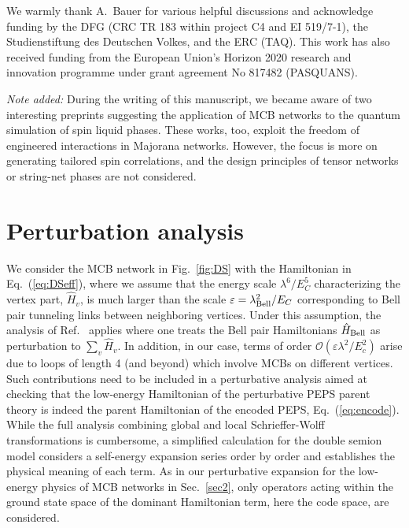 \documentclass[twocolumn,floats,prx,showpacs]{revtex4-1}
\begin{document}
\begin{acknowledgements}
We warmly thank A.\ Bauer for various helpful discussions and acknowledge funding by the DFG (CRC TR 183 within project C4 and EI 519/7-1),
the Studienstiftung des Deutschen Volkes, and the ERC (TAQ). This work has also received funding from the European Union's Horizon 2020 research and innovation 
programme under grant agreement No 817482 (PASQUANS). 

\emph{Note added:}  During the writing of this manuscript, we became aware of two  interesting preprints
\cite{Sagi2018,Thomson2018}  suggesting the application of  MCB networks  to the quantum simulation 
of spin liquid phases. These works, too, exploit the freedom of  engineered  
interactions in Majorana networks. However, the focus is more on generating tailored spin correlations,  and the design principles of tensor networks  or string-net phases are not considered.  
\end{acknowledgements}

\appendix*
\section{Perturbation analysis} \label{secA}

We consider the MCB network in Fig.~\ref{fig:DS} with the Hamiltonian in Eq.~(\ref{eq:DSeff}), where we assume that the energy scale $\lambda^6/E_C^5$ characterizing the vertex part, $\hat H_v$, is much larger than the scale $\varepsilon=\lambda_{\rm Bell}^2/E_C$ corresponding to Bell pair tunneling links between neighboring vertices. Under this assumption, the analysis of Ref.~\cite{Brell2014PEPS} applies where one treats the Bell pair Hamiltonians $\hat H_{\rm Bell}$ as perturbation to $\sum_v \hat H_v$.
In addition, in our case, terms of order $\mathcal O(\varepsilon\lambda^2/E_c^2)$ arise due to loops of length 4 (and beyond) which 
involve MCBs on different vertices. Such contributions need to be
included in a perturbative analysis aimed at checking that the low-energy Hamiltonian of the perturbative PEPS parent theory is indeed the parent Hamiltonian of the encoded PEPS, Eq.~(\ref{eq:encode}). While the full analysis combining global and local Schrieffer-Wolff transformations \cite{Bravyi2011} is cumbersome, a simplified calculation \cite{Brell2014} for the double semion model considers a self-energy expansion series order by order and establishes the physical meaning of each term. As in our perturbative expansion for the low-energy physics of MCB networks in Sec.~\ref{sec2}, 
only operators acting within the ground state space of the dominant Hamiltonian term, here the code space, are considered. 
\end{document}

